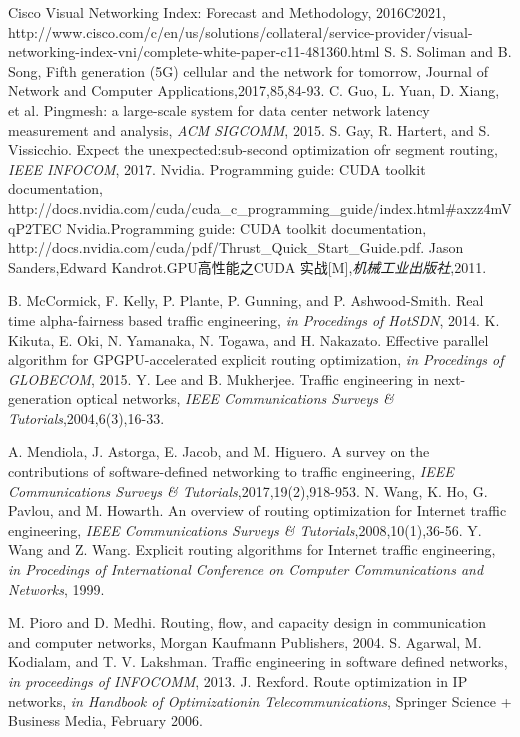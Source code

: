 \documentclass[master]{thesis-uestc}
\begin{document}
\begin{thebibliography}{1}
Cisco Visual Networking Index: Forecast and Methodology, 2016C2021, http://www.cisco.com/c/en/us/solutions/collateral/service-provider/visual-networking-index-vni/complete-white-paper-c11-481360.html
S. S. Soliman and B. Song, Fifth generation (5G) cellular and the network for tomorrow, Journal of Network and Computer Applications,2017,85,84-93.
C. Guo, L. Yuan, D. Xiang, et al. Pingmesh: a large-scale system for data center network latency measurement and analysis, \emph{ACM SIGCOMM}, 2015.
S. Gay, R. Hartert, and S. Vissicchio. Expect the unexpected:sub-second optimization ofr segment routing, \emph{IEEE INFOCOM}, 2017.
Nvidia. Programming guide: CUDA toolkit documentation, http://docs.nvidia.com/cuda/cuda\_c\_programming\_guide/index.html\#axzz4mVqP2TEC
Nvidia.Programming guide: CUDA toolkit documentation, http://docs.nvidia.com/cuda/pdf/Thrust\_Quick\_Start\_Guide.pdf.
Jason Sanders,Edward Kandrot.GPU高性能之CUDA 实战[M],\emph{机械工业出版社},2011.

B. McCormick, F. Kelly, P. Plante, P. Gunning, and P. Ashwood-Smith. Real time alpha-fairness based traffic engineering, \emph{in Procedings of HotSDN}, 2014.
K. Kikuta, E. Oki, N. Yamanaka, N. Togawa, and H. Nakazato. Effective parallel algorithm for GPGPU-accelerated explicit routing optimization, \emph{in Procedings of GLOBECOM}, 2015.
Y. Lee and B. Mukherjee. Traffic engineering in next-generation optical networks, \emph{IEEE Communications Surveys \& Tutorials},2004,6(3),16-33.

A. Mendiola, J. Astorga, E. Jacob, and M. Higuero. A survey on the contributions of software-defined networking to traffic engineering, \emph{IEEE Communications Surveys \& Tutorials},2017,19(2),918-953.
N. Wang, K. Ho, G. Pavlou, and M. Howarth. An overview of routing optimization for Internet traffic engineering, \emph{IEEE Communications Surveys \& Tutorials},2008,10(1),36-56.
Y. Wang and Z. Wang. Explicit routing algorithms for Internet traffic engineering, \emph{in Procedings of International Conference on Computer Communications and Networks}, 1999.

M. Pioro and D. Medhi. Routing, flow, and capacity design in communication and computer networks, Morgan Kaufmann Publishers, 2004.
S. Agarwal, M. Kodialam, and T. V. Lakshman. Traffic engineering in software defined networks, \emph{in proceedings of INFOCOMM}, 2013.
J. Rexford. Route optimization in IP networks, \emph{in Handbook of Optimizationin Telecommunications}, Springer Science + Business Media, February 2006.


\end{thebibliography}
\end{document}
